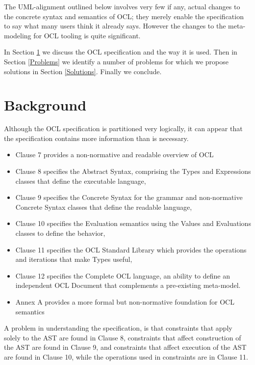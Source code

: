 \documentclass{eceasst}
\begin{document}
The UML-alignment outlined below involves very few if any, actual changes to the concrete syntax and semantics of OCL; they merely enable the specification to say what many users think it already says. However the changes to the meta-modeling for OCL tooling is quite significant.

In Section \ref{Background} we discuss the OCL specification and the way it is used. Then in Section \ref{Problems} we  identify a number of problems for which we propose solutions in Section \ref{Solutions}. Finally we conclude. 

\section{Background}\label{Background}

Although the OCL specification is partitioned very logically, it can appear that the specification contains more information than is necessary.

\begin{itemize}
\item Clause 7 provides a non-normative and readable overview of OCL
\item Clause 8 specifies the Abstract Syntax, comprising the Types and Expressions classes that define the executable language, 
\item Clause 9 specifies the Concrete Syntax for the grammar and non-normative Concrete Syntax classes that define the readable language, 
\item Clause 10 specifies the Evaluation semantics using the Values and Evaluations classes to define the behavior, 
\item Clause 11 specifies the OCL Standard Library which provides the operations and iterations that make Types useful, 
\item Clause 12 specifies the Complete OCL language, an ability to define an independent OCL Document that complements a pre-existing meta-model.
\item Annex A provides a more formal but non-normative foundation for OCL semantics
\end{itemize}

A problem in understanding the specification, is that constraints that apply solely to the AST are found in Clause 8, constraints that affect construction of the AST are found in Clause 9, and constraints that affect execution of the AST are found in Clause 10, while the operations used in constraints are in Clause 11.
\end{document}
